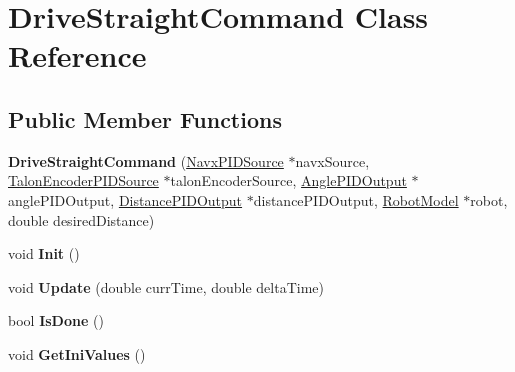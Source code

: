 \hypertarget{class_drive_straight_command}{}\section{Drive\+Straight\+Command Class Reference}
\label{class_drive_straight_command}
\subsection*{Public Member Functions}
\begin{DoxyCompactItemize}
\item 
\mbox{\label{class_drive_straight_command_a44a3540b0988f82cff5dbee7d3d2b552}} 
{\bfseries Drive\+Straight\+Command} (\hyperlink{class_navx_p_i_d_source}{Navx\+P\+I\+D\+Source} $\ast$navx\+Source, \hyperlink{class_talon_encoder_p_i_d_source}{Talon\+Encoder\+P\+I\+D\+Source} $\ast$talon\+Encoder\+Source, \hyperlink{class_angle_p_i_d_output}{Angle\+P\+I\+D\+Output} $\ast$angle\+P\+I\+D\+Output, \hyperlink{class_distance_p_i_d_output}{Distance\+P\+I\+D\+Output} $\ast$distance\+P\+I\+D\+Output, \hyperlink{class_robot_model}{Robot\+Model} $\ast$robot, double desired\+Distance)
\item 
\mbox{\label{class_drive_straight_command_aaee34fdec667e42e4a3df6cce27d5dda}} 
void {\bfseries Init} ()
\item 
\mbox{\label{class_drive_straight_command_aec2f8dadd78449084e7163b75be49b9e}} 
void {\bfseries Update} (double curr\+Time, double delta\+Time)
\item 
\mbox{\label{class_drive_straight_command_a0bfb99a9cbdfb2b994cc2af46149789e}} 
bool {\bfseries Is\+Done} ()
\item 
\mbox{\label{class_drive_straight_command_a55ffe257f2ee1892dc4ded618eeb2877}} 
void {\bfseries Get\+Ini\+Values} ()
\end{DoxyCompactItemize}
